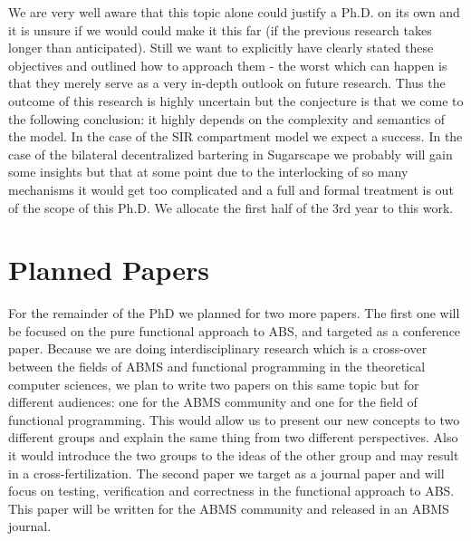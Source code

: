We are very well aware that this topic alone could justify a Ph.D. on its own and it is unsure if we would could make it this far (if the previous research takes longer than anticipated). Still we want to explicitly have clearly stated these objectives and outlined how to approach them - the worst which can happen is that they merely serve as a very in-depth outlook on future research.
Thus the outcome of this research is highly uncertain but the conjecture is that we come to the following conclusion: it highly depends on the complexity and semantics of the model. In the case of the SIR compartment model we expect a success. In the case of the bilateral decentralized bartering in Sugarscape we probably will gain some insights but that at some point due to the interlocking of so many mechanisms it would get too complicated and a full and formal treatment is out of the scope of this Ph.D.
We allocate the first half of the 3rd year to this work.

\section{Planned Papers}
For the remainder of the PhD we planned for two more papers.
The first one will be focused on the pure functional approach to ABS, and targeted as a conference paper. Because we are doing interdisciplinary research which is a cross-over between the fields of ABMS and functional programming in the theoretical computer sciences, we plan to write two papers on this same topic but for different audiences: one for the ABMS community and one for the field of functional programming. This would allow us to present our new concepts to two different groups and explain the same thing from two different perspectives. Also it would introduce the two groups to the ideas of the other group and may result in a cross-fertilization.
The second paper we target as a journal paper and will focus on testing, verification and correctness in the functional approach to ABS. This paper will be written for the ABMS community and released in an ABMS journal. 

\clearpage

\begin{landscape}
	\label{fig:gantt}
	\centering
	
\end{landscape}